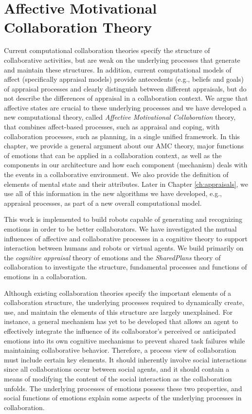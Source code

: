 \documentclass[12pt]{report}
\begin{document}
\chapter{Affective Motivational Collaboration Theory}
\label{ch:amct}
\vspace*{-5mm}
Current computational collaboration theories specify the structure of
collaborative activities, but are weak on the underlying processes that generate
and maintain these structures. In addition, current computational
models of affect (specifically appraisal models) provide antecedents (e.g.,
beliefs and goals) of appraisal processes and clearly distinguish between
different appraisals, but do not describe the differences of appraisal in a
collaboration context. We argue that affective states are crucial to these
underlying processes and we have developed a new computational theory, called
\textit{Affective Motivational Collaboration} theory, that combines
affect-based processes, such as appraisal and coping, with collaboration
processes, such as planning, in a single unified framework. In this
chapter, we provide a general argument about our AMC theory, major functions of
emotions that can be applied in a collaboration context, as well as the
components in our architecture and how each component (mechanism) deals with the events in
a collaborative environment. We also provide the definition of elements of
mental state and their attributes. Later in Chapter \ref{ch:appraisals}, we use
all of this information in the new algorithms we have developed, e.g.,
appraisal processes, as part of a new overall computational model.

This work is implemented to build robots capable of generating and recognizing
emotions in order to be better collaborators. We have investigated the mutual
influences of affective and collaborative processes in a cognitive theory to
support interaction between humans and robots or virtual agents. We build
primarily on the \textit{cognitive appraisal} theory of emotions and the
\textit{SharedPlans} theory of collaboration to investigate the structure,
fundamental processes and functions of emotions in a collaboration.

Although existing collaboration theories specify the important elements of a
collaboration structure, the underlying processes required to dynamically
create, use, and maintain the elements of this structure are largely
unexplained. For instance, a general mechanism has yet to be developed that
allows an agent to effectively integrate the influence of its collaborator's
perceived or anticipated emotions into its own cognitive mechanisms to prevent
shared task failures while maintaining collaborative behavior. Therefore, a
process view of collaboration must include certain key elements. It should
inherently involve social interactions since all collaborations occur between
social agents, and it should contain a means of modifying the content of the
social interaction as the collaboration unfolds. The underlying processes of
emotions possess these two properties, and social functions of emotions explain
some aspects of the underlying processes in collaboration.
\end{document}
